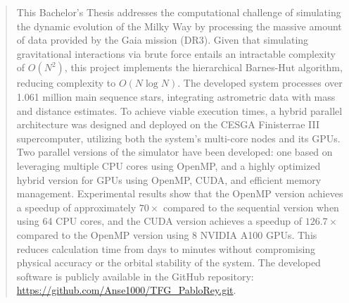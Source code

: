 \begin{abstract}
\begin{segundoresumo}
        This Bachelor's Thesis addresses the computational challenge of simulating the dynamic evolution of the Milky Way by processing the massive amount of data provided by the Gaia mission (DR3).
        Given that simulating gravitational interactions via brute force entails an intractable complexity of $O(N^2)$, this project implements the hierarchical Barnes-Hut algorithm, reducing complexity to $O(N \log N)$.
        The developed system processes over 1.061 million main sequence stars, integrating astrometric data with mass and distance estimates.
        To achieve viable execution times, a hybrid parallel architecture was designed and deployed on the CESGA Finisterrae III supercomputer, utilizing both the system's multi-core nodes and its GPUs.
        Two parallel versions of the simulator have been developed: one based on leveraging multiple CPU cores using OpenMP, and a highly optimized hybrid version for GPUs using OpenMP, CUDA, and efficient memory management.
        Experimental results show that the OpenMP version achieves a speedup of approximately $70\times$ compared to the sequential version when using 64 CPU cores, and the CUDA version achieves a speedup of $126.7\times$ compared to the OpenMP version using 8 NVIDIA A100 GPUs. This reduces calculation time from days to minutes without compromising physical accuracy or the orbital stability of the system.
        The developed software is publicly available in the GitHub repository: \url{https://github.com/Anse1000/TFG_PabloRey.git}.

    \end{segundoresumo}
    \vspace*{25pt}
    
\end{abstract}
\pagestyle{fancy}


